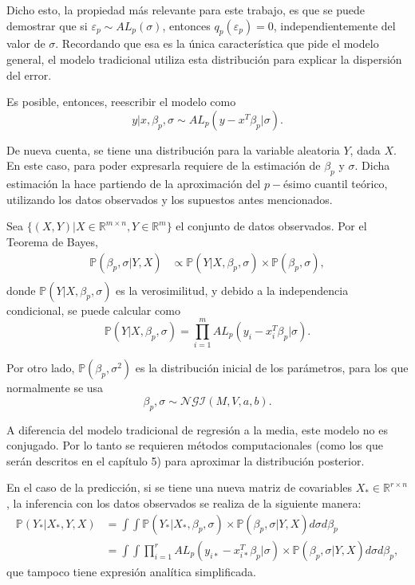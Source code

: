 Dicho esto, la propiedad m\'as relevante para este trabajo, es que se puede demostrar que si $\varepsilon_p \sim AL_p(\sigma)$, entonces $q_p(\varepsilon_p) = 0$, independientemente del valor de $\sigma$. Recordando que esa es la \'unica caracter\'istica que pide el modelo general, el modelo tradicional utiliza esta distribuci\'on para explicar la dispersi\'on del error.

Es posible, entonces, reescribir el modelo como
\begin{equation*}
    y | x, \beta_p, \sigma 
    \sim 
    AL_p(y - x^T\beta_p|\sigma).
\end{equation*}

De nueva cuenta, se tiene una distribuci\'on para la variable aleatoria $Y$, dada $X$. En este caso, para poder expresarla requiere de la estimaci\'on de $\beta_p$ y $\sigma$. Dicha estimaci\'on la hace partiendo de la aproximaci\'on del $p-$\'esimo cuantil te\'orico, utilizando los datos observados y los supuestos antes mencionados.

Sea $\{(X,Y) | X \in \mathbb{R}^{m \times n}, Y \in \mathbb{R}^m\}$ el conjunto de datos observados. Por el Teorema de Bayes,
\begin{equation*}
\begin{aligned}
    \mathbb{P}(\beta_p,\sigma | Y, X) 
    &\propto \mathbb{P}(Y| X, \beta_p, \sigma) \times \mathbb{P}(\beta_p, \sigma), \\
\end{aligned}
\end{equation*}
donde $\mathbb{P}(Y| X, \beta_p, \sigma)$ es la verosimilitud, y debido a la independencia condicional, se puede calcular como 
\begin{equation*}
    \mathbb{P}(Y| X, \beta_p, \sigma)
    =
    \prod_{i=1}^m AL_p(y_i - x_i^T\beta_p|\sigma).
\end{equation*}

Por otro lado, $\mathbb{P}(\beta_p,\sigma^2)$ es la distribuci\'on inicial de los par\'ametros, para los que normalmente se usa
\begin{equation*}
    \beta_p,\sigma \sim \mathcal{NGI}(M,V,a,b). 
\end{equation*}

A diferencia del modelo tradicional de regresi\'on a la media, este modelo no es conjugado. Por lo tanto se requieren m\'etodos computacionales (como los que ser\'an descritos en el cap\'itulo 5) para aproximar la distribuci\'on posterior.

En el caso de la predicci\'on, si se tiene una nueva matriz de covariables $X_* \in \mathbb{R}^{r \times n}$, la inferencia con los datos observados se realiza de la siguiente manera:
\begin{equation*}
\begin{aligned}
    \mathbb{P}(Y_*|X_*,Y,X)
    &= \int \int \mathbb{P}(Y_*|X_*,\beta_p,\sigma) \times \mathbb{P}(\beta_p,\sigma|Y,X) d\sigma d\beta_p \\
    &= \int \int \prod_{i=1}^r AL_p(y_{i*} - x_{i*}^T\beta_p|\sigma) \times \mathbb{P}(\beta_p,\sigma|Y,X) d\sigma d\beta_p,
\end{aligned}
\end{equation*}
que tampoco tiene expresi\'on anal\'itica simplificada.

